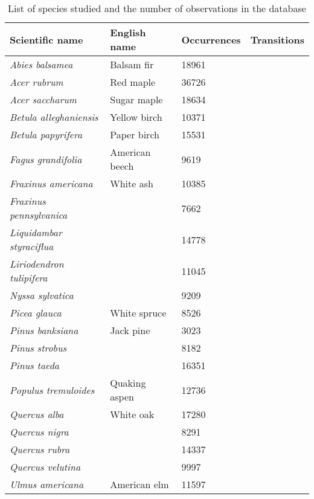 \begin{table}[tb]
\label{tab:species_list}
\caption{List of species studied and the number of observations in the database}
\begin{tabular}{llll}
\toprule
Scientific name               & English name   & Occurrences & Transitions \\ 
\midrule
{\it Abies balsamea}          & Balsam fir     & 18961       &             \\
{\it Acer rubrum}             & Red maple      & 36726       &             \\
{\it Acer saccharum}          & Sugar maple    & 18634       &             \\
{\it Betula alleghaniensis}   & Yellow birch   & 10371       &             \\
{\it Betula papyrifera}       & Paper birch    & 15531       &             \\
{\it Fagus grandifolia}       & American beech & 9619        &             \\
{\it Fraxinus americana}      & White ash      & 10385       &             \\
{\it Fraxinus pennsylvanica}  &                & 7662        &             \\
{\it Liquidambar styraciflua} &                & 14778       &             \\
{\it Liriodendron tulipifera} &                & 11045       &             \\
{\it Nyssa sylvatica}         &                & 9209        &             \\
{\it Picea glauca}            & White spruce   & 8526        &             \\
{\it Pinus banksiana}         & Jack pine      & 3023        &             \\
{\it Pinus strobus}           &                & 8182        &             \\
{\it Pinus taeda}             &                & 16351       &             \\
{\it Populus tremuloides}     & Quaking aspen  & 12736       &             \\ 
{\it Quercus alba}            & White oak      & 17280       &             \\
{\it Quercus nigra}           &                & 8291        &             \\
{\it Quercus rubra}           &                & 14337       &             \\
{\it Quercus velutina}        &                & 9997        &             \\
{\it Ulmus americana}         & American elm   & 11597       &             \\ 
\bottomrule
\end{tabular}
\end{table}

